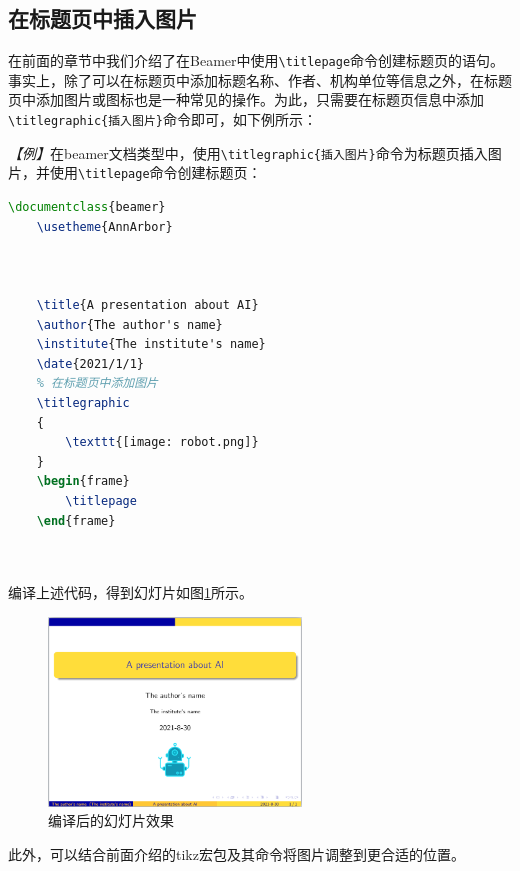\subsection{在标题页中插入图片}

在前面的章节中我们介绍了在Beamer中使用\texttt{\textbackslash{}titlepage}命令创建标题页的语句。事实上，除了可以在标题页中添加标题名称、作者、机构单位等信息之外，在标题页中添加图片或图标也是一种常见的操作。为此，只需要在标题页信息中添加\texttt{\textbackslash{}titlegraphic\{插入图片\}}命令即可，如下例所示：

\emph{【例】}在beamer文档类型中，使用\texttt{\textbackslash{}titlegraphic\{插入图片\}}命令为标题页插入图片，并使用\texttt{\textbackslash{}titlepage}命令创建标题页：
\begin{lstlisting}[language=TeX]
    \documentclass{beamer}
    \usetheme{AnnArbor}

    

    \title{A presentation about AI}
    \author{The author's name}
    \institute{The institute's name}
    \date{2021/1/1}
    % 在标题页中添加图片
    \titlegraphic
    {
        \texttt{[image: robot.png]}
    }
    \begin{frame}
        \titlepage
    \end{frame}

    
\end{lstlisting}

编译上述代码，得到幻灯片如图\ref{fig:950}所示。

\begin{figure}[htbp]
    \centering
    \includegraphics[width = 0.6\textwidth]{images/ch_9/eg6_10.png}
    \caption{编译后的幻灯片效果}
    \label{fig:950}
\end{figure}

此外，可以结合前面介绍的tikz宏包及其命令将图片调整到更合适的位置。


